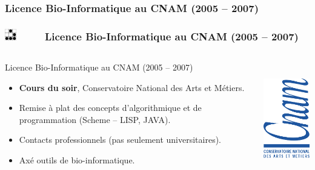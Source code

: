 \documentclass[slidetop,11pt]{beamer}
\def\sectionPartIIaDE{Licence Bio-Informatique au CNAM (2005 -- 2007)}
\def\moreInFrameTitle{\includegraphics[height=0.5cm]{img/logo_glider.png}~~~~~}
\begin{document}
\subsubsection{\sectionPartIIaDE}
\begin{frame}
	\frametitle{\moreInFrameTitle \sectionPartIIaDE}
	\begin{columns}[T]
	\begin{column}[T]{7cm}
		\begin{beamerboxesrounded}	[lower=substructureDE, %
		 				 upper=block title DE,%
						 shadow=true]%
		       {\sectionPartIIaDE}
			\begin{itemize}
				\item \textbf{Cours du soir}, Conservatoire National des Arts et M{\'e}tiers. 
				\item Remise {\`a} plat des concepts d'algorithmique et de programmation (Scheme -- LISP, JAVA). 
				\item Contacts professionnels (pas seulement universitaires). 
				\item Ax{\'e} outils de bio-informatique. 
			\end{itemize}
		\end{beamerboxesrounded}
	\end{column}
	\begin{column}[T]{3cm}
		\includegraphics[height=5cm]{img/logo_cnam.png}
	\end{column}
	\end{columns}
\end{frame}
\end{document}

